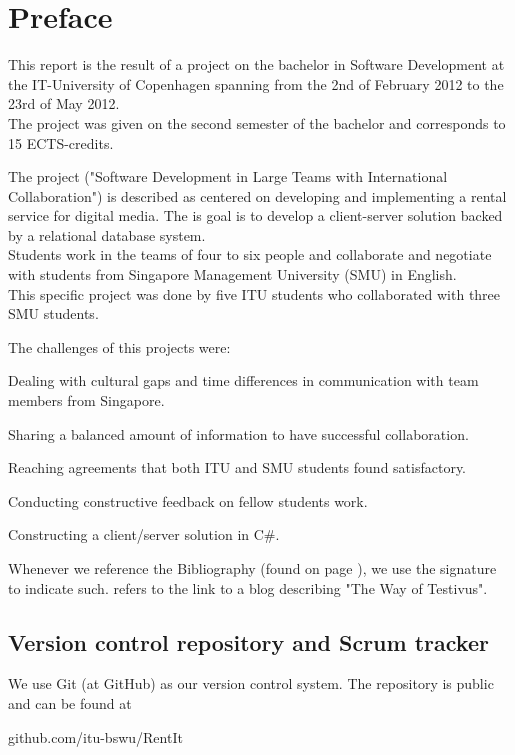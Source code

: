 \chapter{Preface}
\label{Preface}
This report is the result of a project on the bachelor in Software Development at the IT-University of Copenhagen spanning from the 2nd of February 2012 to the 23rd of May 2012. \\The project was given on the second semester of the bachelor and corresponds to 15 ECTS-credits.

The project ("Software Development in Large Teams with International Collaboration") is described as centered on developing and implementing a rental service for digital media. The is goal is to develop a client-server solution backed by a relational database system. \\Students work in the teams of four to six people and collaborate and negotiate with students from Singapore Management University (SMU) in English.\\This specific project was done by five ITU students who collaborated with three SMU students.

The challenges of this projects were:
\begin{my_itemize}
\item Dealing with cultural gaps and time differences in communication with team members from Singapore.
\item Sharing a balanced amount of information to have successful collaboration.
\item Reaching agreements that both ITU and SMU students found satisfactory.
\item Conducting constructive feedback on fellow students work.
\item Constructing a client/server solution in C\#.
\end{my_itemize}
Whenever we reference the Bibliography (found on page \pageref{Biblio}), we use the signature \cite{WoT} to indicate such. \cite{WoT} refers to the link to a blog describing "The Way of Testivus".

\section{Version control repository and Scrum tracker}
\label{Preface_Trackers}
We use Git (at GitHub) as our version control system. The repository is public and can be found at \begin{my_itemize}\item github.com/itu-bswu/RentIt\end{my_itemize}

